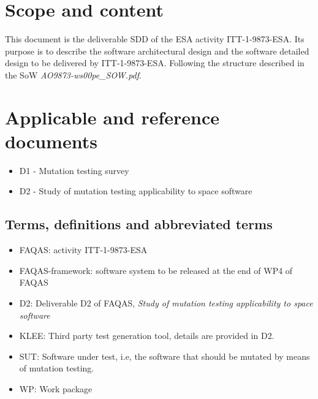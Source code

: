 
\chapter{Scope and content}

This document is the deliverable SDD of the ESA activity ITT-1-9873-ESA. Its purpose is to describe the software architectural design and the software detailed design to be delivered by ITT-1-9873-ESA. Following the structure described in the SoW \emph{AO9873-ws00pe\_SOW.pdf}. 


\chapter{Applicable and reference documents}

\begin{itemize}
\item{D1 - Mutation testing survey}
\item{D2 - Study of mutation testing applicability to space software}
\end{itemize}

\section{Terms, definitions and abbreviated terms}

\begin{itemize}
\item{FAQAS}: activity ITT-1-9873-ESA
\item{FAQAS-framework}: software system to be released at the end of WP4 of FAQAS
\item{D2}: Deliverable D2 of FAQAS, \emph{Study of mutation testing applicability to space software}
\item{KLEE}: Third party test generation tool, details are provided in D2.
\item{SUT}: Software under test, i.e, the software that should be mutated by means of mutation testing.
\item{WP}: Work package
\end{itemize}

\clearpage


